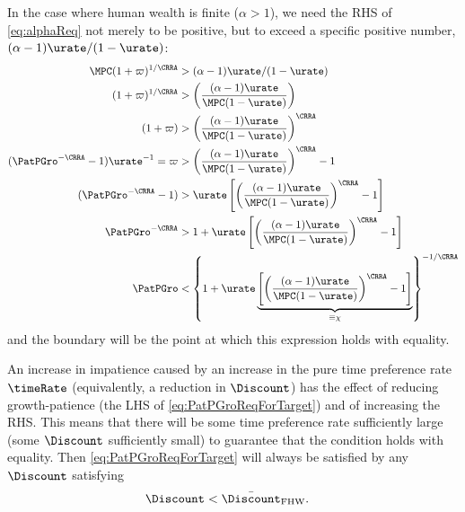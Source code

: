 \documentclass{\handout}
\begin{document}
In the case where human wealth is finite ($\alpha > 1$), we need the RHS of \eqref{eq:alphaReq} not merely to be positive, but to exceed a specific positive number, $(\alpha-1)\urate/(1-\urate)$:  
\begin{equation}\begin{gathered}\begin{aligned}
    \MPCU (1+\varpi)^{1/\CRRA} & >  (\alpha-1)\urate/(1-\urate)
\\   (1+\varpi)^{1/\CRRA} & >  \left(\frac{(\alpha-1)\urate}{\MPCU (1-\urate)}\right)
\\   (1+\varpi) & >  \left(\frac{(\alpha-1)\urate}{\MPCU (1-\urate)}\right)^{\CRRA}
\\  (\PatPGro^{-\CRRA}-1)\urate^{-1} = \varpi & >  \left(\frac{(\alpha-1)\urate}{\MPCU (1-\urate)}\right)^{\CRRA}-1
\\  (\PatPGro^{-\CRRA}-1) & >  \urate \left[\left(\frac{(\alpha-1)\urate}{\MPCU (1-\urate)}\right)^{\CRRA}-1\right]
\\  \PatPGro^{-\CRRA} & >  1  + \urate \left[\left(\frac{(\alpha-1)\urate}{\MPCU (1-\urate)}\right)^{\CRRA}-1\right]
\\  \PatPGro & <  \left\{1  + \urate \underbrace{\left[\left(\frac{(\alpha-1)\urate}{\MPCU (1-\urate)}\right)^{\CRRA}-1\right]}_{\equiv \chi} \right\}^{-1/\CRRA} \label{eq:PatPGroReqForTarget}
\end{aligned}\end{gathered}\end{equation}
and the boundary will be the point at which this expression holds with equality.  

An increase in impatience caused by an increase in the pure time preference rate $\timeRate$ (equivalently, a reduction in $\Discount$) has the effect of reducing growth-patience (the LHS of \eqref{eq:PatPGroReqForTarget}) and of increasing the RHS.  This means that there will be some time preference rate sufficiently large (some $\Discount$ sufficiently small) to guarantee that the condition holds with equality.  Then \eqref{eq:PatPGroReqForTarget} will always be satisfied by any $\Discount$ satisfying 
\begin{equation}\begin{gathered}\begin{aligned}
  \Discount & <  \DiscountMaxGICWhenFHWCTBSHolds \label{eq:DiscountMaxGICWhenFHWCTBSHolds}
.\end{aligned}\end{gathered}\end{equation}
\end{document}
